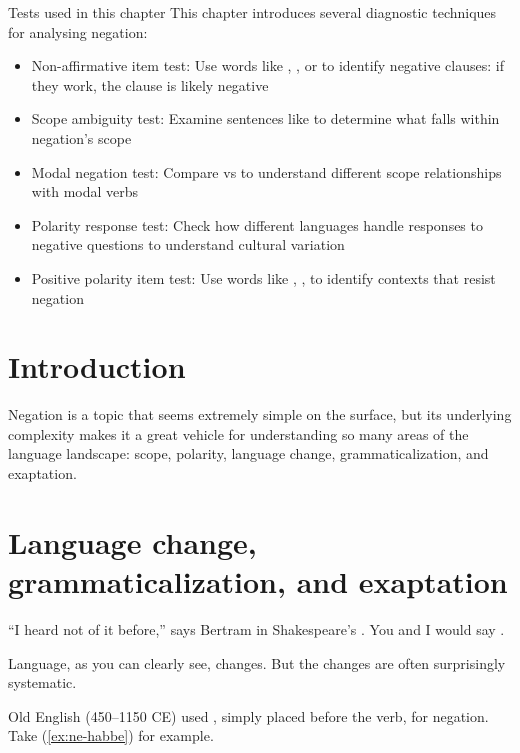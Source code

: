 \begin{tblsfilled}{Tests used in this chapter}
This chapter introduces several diagnostic techniques for analysing negation:
\begin{itemize}[noitemsep, leftmargin=*]
    \item Non-affirmative item test: Use words like , , or  to identify negative clauses: if they work, the clause is likely negative
    \item Scope ambiguity test: Examine sentences like  to determine what falls within negation's scope
    \item Modal negation test: Compare  vs  to understand different scope relationships with modal verbs
    \item Polarity response test: Check how different languages handle responses to negative questions to understand cultural variation
    \item Positive polarity item test: Use words like , ,  to identify contexts that resist negation
\end{itemize}
\end{tblsfilled}

\section{Introduction} 
Negation is a topic that seems extremely simple on the surface, but its underlying complexity makes it a great vehicle for understanding so many areas of the language landscape: scope, polarity, language change, grammaticalization, and exaptation.

\section{Language change, grammaticalization, and exaptation}

\enquote{I heard not of it before,} says Bertram in Shakespeare's . You and I would say .

Language, as you can clearly see, changes. But the changes are often surprisingly systematic.

Old English (450--1150 CE) used , simply placed before the verb, for negation. Take (\ref{ex:ne-habbe}) for example.


